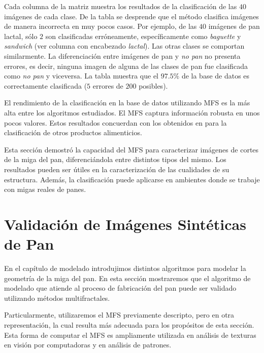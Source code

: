 Cada columna de la matriz muestra los resultados de la clasificación de las $40$ imágenes de cada clase.
De la tabla se desprende que el método clasifica imágenes de manera incorrecta en muy pocos casos.
Por ejemplo, de las $40$ imágenes de pan lactal, sólo $2$ son clasificadas erróneamente, específicamente como {\em baguette} y {\em sandwich} (ver columna con encabezado {\em lactal}).
Las otras clases se comportan similarmente.
La diferenciación entre imágenes de pan y {\em no pan} no presenta errores, es decir, ninguna imagen de alguna de las clases de pan fue clasificada como {\em no pan} y viceversa.
La tabla muestra que el $97.5\%$ de la base de datos es correctamente clasificada ($5$ errores de $200$ posibles).

El rendimiento de la clasificación en la base de datos utilizando MFS es la más alta entre los algoritmos estudiados.
El MFS captura información robusta en unos pocos valores.
Estos resultados concuerdan con los obtenidos en \cite{Bosch2011} para la clasificación de otros productos alimenticios.

Esta sección demostró la capacidad del MFS para caracterizar imágenes de cortes de la miga del pan, diferenciándola entre distintos tipos del mismo.
Los resultados pueden ser útiles en la caracterización de las cualidades de su estructura.
Además, la clasificación puede aplicarse en ambientes donde se trabaje con migas reales de panes.



\section{Validación de Imágenes Sintéticas de Pan}

En el capítulo de modelado introdujimos distintos algoritmos para modelar la geometría de la miga del pan.
En esta sección mostraremos que el algoritmo de modelado que atiende al proceso de fabricación del pan puede ser validado utilizando métodos multifractales.

Particularmente, utilizaremos el MFS previamente descripto, pero en otra representación, la cual resulta más adecuada para los propósitos de esta sección.
Esta forma de computar el MFS es ampliamente utilizada en análisis de texturas en visión por computadoras y en análisis de patrones.

